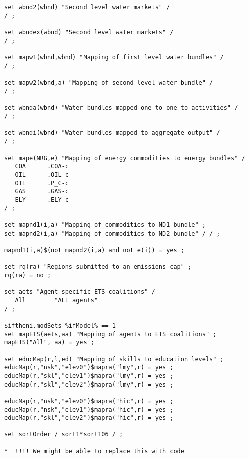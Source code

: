 \begin{lstlisting}[language=GAMS, caption={Example 'Sets' file for the \textsc{Envisage} model}, label=lst:SetsFileExample]
set wbnd2(wbnd) "Second level water markets" /
/ ;

set wbndex(wbnd) "Second level water markets" /
/ ;

set mapw1(wbnd,wbnd) "Mapping of first level water bundles" /
/ ;

set mapw2(wbnd,a) "Mapping of second level water bundle" /
/ ;

set wbnda(wbnd) "Water bundles mapped one-to-one to activities" /
/ ;

set wbndi(wbnd) "Water bundles mapped to aggregate output" /
/ ;

set mape(NRG,e) "Mapping of energy commodities to energy bundles" /
   COA      .COA-c
   OIL      .OIL-c
   OIL      .P_C-c
   GAS      .GAS-c
   ELY      .ELY-c
/ ;

set mapnd1(i,a) "Mapping of commodities to ND1 bundle" ;
set mapnd2(i,a) "Mapping of commodities to ND2 bundle" / / ;

mapnd1(i,a)$(not mapnd2(i,a) and not e(i)) = yes ;

set rq(ra) "Regions submitted to an emissions cap" ;
rq(ra) = no ;

set aets "Agent specific ETS coalitions" /
   All        "ALL agents"
/ ;

$iftheni.modSets %ifModel% == 1
set mapETS(aets,aa) "Mapping of agents to ETS coalitions" ;
mapETS("All", aa) = yes ;

set educMap(r,l,ed) "Mapping of skills to education levels" ;
educMap(r,"nsk","elev0")$mapra("lmy",r) = yes ;
educMap(r,"skl","elev1")$mapra("lmy",r) = yes ;
educMap(r,"skl","elev2")$mapra("lmy",r) = yes ;

educMap(r,"nsk","elev0")$mapra("hic",r) = yes ;
educMap(r,"nsk","elev1")$mapra("hic",r) = yes ;
educMap(r,"skl","elev2")$mapra("hic",r) = yes ;

set sortOrder / sort1*sort106 / ;

*  !!!! We might be able to replace this with code


\end{lstlisting}
